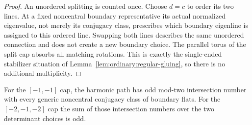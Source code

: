 \begin{proof}
An unordered splitting is counted once.  Choose $d=c$
to order its two lines.  At a fixed noncentral boundary
representative its actual normalized eigenvalue, not
merely its conjugacy class, prescribes which boundary
eigenline is assigned to this ordered line.  Swapping
both lines describes the same unordered connection and
does not create a new boundary choice.  The parallel
torus of the split cap absorbs all matching rotations.
This is exactly the single-ended stabilizer situation
of Lemma~\ref{lem:ordinary:regular-gluing}, so there is
no additional multiplicity.
\end{proof}

\begin{lemma}
\label{lem:ordinary:holonomy-degree}
For the $[-1,-1]$ cap, the harmonic path has odd mod-two
intersection number with every generic noncentral conjugacy
class of boundary flats.  For the $[-2,-1,-2]$ cap the sum of
those intersection numbers over the two determinant choices
is odd.
\end{lemma}
